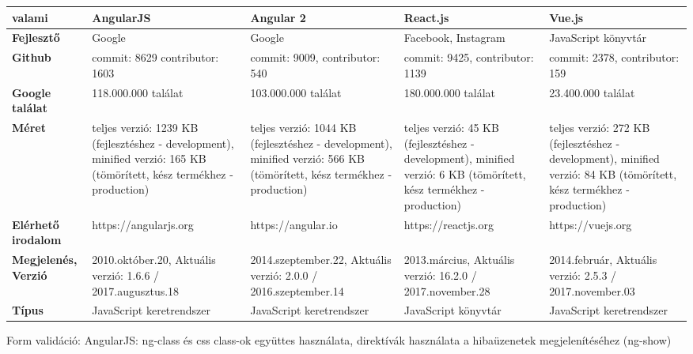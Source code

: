 
\begin{tabular}{|l|l|l|l|p{5cm}|}
\hline
\textbf{valami} & \textbf{AngularJS} & \textbf{Angular 2} & \textbf{React.js} & \textbf{Vue.js} \\
\hline
\textbf{Fejlesztő} & Google & Google & Facebook, Instagram & JavaScript könyvtár \\
\hline
\textbf{Github} & commit: 8629 contributor: 1603 & commit: 9009, contributor: 540 & commit: 9425, contributor: 1139 & commit: 2378, contributor: 159 \\
\hline
\textbf{Google találat} & 118.000.000 találat  & 103.000.000 találat & 180.000.000 találat & 23.400.000 találat \\
\hline
\textbf{Méret} & teljes verzió: 1239 KB (fejlesztéshez - development), minified verzió: 165 KB (tömörített, kész termékhez - production) &  teljes verzió: 1044 KB (fejlesztéshez - development), minified verzió: 566 KB (tömörített, kész termékhez - production) & teljes verzió: 45 KB (fejlesztéshez - development), minified verzió: 6 KB (tömörített, kész termékhez - production) & teljes verzió: 272 KB (fejlesztéshez - development), minified verzió: 84 KB (tömörített, kész termékhez - production) \\
\hline
\textbf{Elérhető irodalom} & https://angularjs.org & https://angular.io & https://reactjs.org & https://vuejs.org \\
\hline
\textbf{Megjelenés, Verzió} & 2010.október.20, Aktuális verzió: 1.6.6 / 2017.augusztus.18 & 2014.szeptember.22, Aktuális verzió: 2.0.0 / 2016.szeptember.14 & 2013.március, Aktuális verzió: 16.2.0 / 2017.november.28 & 2014.február, Aktuális verzió: 2.5.3 / 2017.november.03 \\
\hline
\textbf{Típus} & JavaScript keretrendszer & JavaScript keretrendszer & JavaScript könyvtár & JavaScript keretrendszer \\
\hline
\end{tabular}

Form validáció:
AngularJS: ng-class és css class-ok együttes használata, direktívák használata a hibaüzenetek megjelenítéséhez (ng-show)
